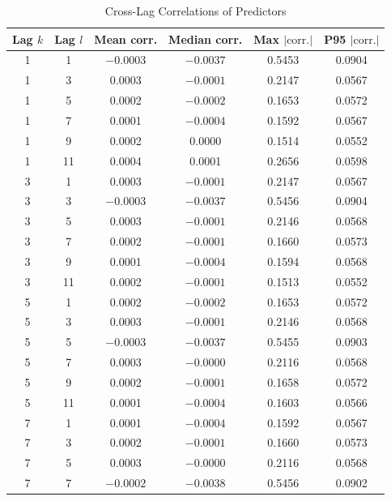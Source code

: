 \endgroup



\begin{table}[H]
\centering
\caption{Cross-Lag Correlations of Predictors}
\label{tab:cross_lag_correlations}
\scriptsize
\setlength{\tabcolsep}{6pt}
\renewcommand{\arraystretch}{1.15}

\begin{tabular}{cccccc}
\toprule
Lag $k$ & Lag $l$ & Mean corr. & Median corr. & Max $|\text{corr.}|$ & P95 $|\text{corr.}|$ \\
\midrule
1  & 1  & $-0.0003$ & $-0.0037$ & 0.5453 & 0.0904 \\
1  & 3  &  0.0003  & $-0.0001$ & 0.2147 & 0.0567 \\
1  & 5  &  0.0002  & $-0.0002$ & 0.1653 & 0.0572 \\
1  & 7  &  0.0001  & $-0.0004$ & 0.1592 & 0.0567 \\
1  & 9  &  0.0002  &  0.0000  & 0.1514 & 0.0552 \\
1  & 11 &  0.0004  &  0.0001  & 0.2656 & 0.0598 \\
\midrule
3  & 1  &  0.0003  & $-0.0001$ & 0.2147 & 0.0567 \\
3  & 3  & $-0.0003$ & $-0.0037$ & 0.5456 & 0.0904 \\
3  & 5  &  0.0003  & $-0.0001$ & 0.2146 & 0.0568 \\
3  & 7  &  0.0002  & $-0.0001$ & 0.1660 & 0.0573 \\
3  & 9  &  0.0001  & $-0.0004$ & 0.1594 & 0.0568 \\
3  & 11 &  0.0002  & $-0.0001$ & 0.1513 & 0.0552 \\
\midrule
5  & 1  &  0.0002  & $-0.0002$ & 0.1653 & 0.0572 \\
5  & 3  &  0.0003  & $-0.0001$ & 0.2146 & 0.0568 \\
5  & 5  & $-0.0003$ & $-0.0037$ & 0.5455 & 0.0903 \\
5  & 7  &  0.0003  & $-0.0000$ & 0.2116 & 0.0568 \\
5  & 9  &  0.0002  & $-0.0001$ & 0.1658 & 0.0572 \\
5  & 11 &  0.0001  & $-0.0004$ & 0.1603 & 0.0566 \\
\midrule
7  & 1  &  0.0001  & $-0.0004$ & 0.1592 & 0.0567 \\
7  & 3  &  0.0002  & $-0.0001$ & 0.1660 & 0.0573 \\
7  & 5  &  0.0003  & $-0.0000$ & 0.2116 & 0.0568 \\
7  & 7  & $-0.0002$ & $-0.0038$ & 0.5456 & 0.0902 \\

\end{tabular}
\end{table}
